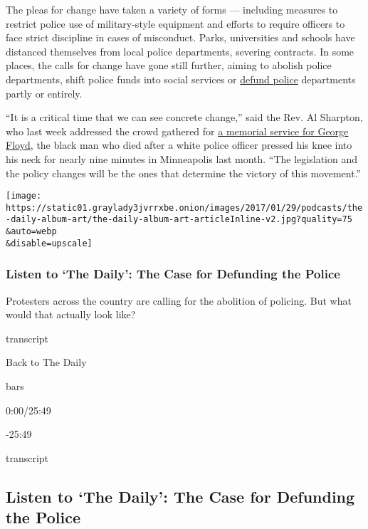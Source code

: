 The pleas for change have taken a variety of forms --- including
measures to restrict police use of military-style equipment and efforts
to require officers to face strict discipline in cases of misconduct.
Parks, universities and schools have distanced themselves from local
police departments, severing contracts. In some places, the calls for
change have gone still further, aiming to abolish police departments,
shift police funds into social services or
\href{https://www.nytimes3xbfgragh.onion/2020/06/09/us/ca-defund-police.html}{defund
police} departments partly or entirely.

``It is a critical time that we can see concrete change,'' said the Rev.
Al Sharpton, who last week addressed the crowd gathered for
\href{https://www.nytimes3xbfgragh.onion/2020/06/08/us/george-floyd-viewing-funeral-houston-unrest.html}{a
memorial service for George Floyd}, the black man who died after a white
police officer pressed his knee into his neck for nearly nine minutes in
Minneapolis last month. ``The legislation and the policy changes will be
the ones that determine the victory of this movement.''

\texttt{[image: https://static01.graylady3jvrrxbe.onion/images/2017/01/29/podcasts/the-daily-album-art/the-daily-album-art-articleInline-v2.jpg?quality=75\\\&auto=webp\\\&disable=upscale]}

\hypertarget{listen-to-the-daily-the-case-for-defunding-the-police}{%
\subsubsection{Listen to `The Daily': The Case for Defunding the
Police}\label{listen-to-the-daily-the-case-for-defunding-the-police}}

Protesters across the country are calling for the abolition of policing.
But what would that actually look like?

transcript

Back to The Daily

bars

0:00/25:49

-25:49

transcript

\hypertarget{listen-to-the-daily-the-case-for-defunding-the-police-1}{%
\subsection{Listen to `The Daily': The Case for Defunding the
Police}\label{listen-to-the-daily-the-case-for-defunding-the-police-1}}

